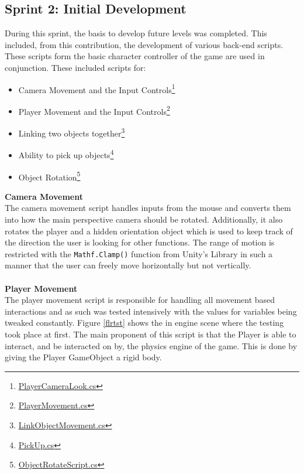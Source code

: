 \subsection{Sprint 2: Initial Development}
During this sprint, the basis to develop future levels was completed. This included, from this contribution, the development of various back-end scripts. These scripts form the basic character controller of the game are used in conjunction. These included scripts for:
\begin{itemize}
\item Camera Movement and the Input Controls\footnote{\href{https://github.com/Josh-SCG/Spherical_Shadows/blob/main/Assets/Scripts/PlayerCameraLook.cs}{PlayerCameraLook.cs}}

\item Player Movement and the Input Controls\footnote{\href{https://github.com/Josh-SCG/Spherical_Shadows/blob/main/Assets/Scripts/PlayerMovement.cs}{PlayerMovement.cs}}

\item Linking two objects together\footnote{\href{https://github.com/Josh-SCG/Spherical_Shadows/blob/main/Assets/Scripts/LinkObjectMovement.cs}{LinkObjectMovement.cs}}

\item Ability to pick up objects\footnote{\href{https://github.com/Josh-SCG/Spherical_Shadows/blob/main/Assets/Scripts/PickUp.cs}{PickUp.cs}}

\item Object Rotation\footnote{\href{https://github.com/Josh-SCG/Spherical_Shadows/blob/main/Assets/Scripts/ObjectRotateScript.cs}{ObjectRotateScript.cs}}
\end{itemize}
\newpage
\noindent \textbf{Camera Movement}\\
The camera movement script handles inputs from the mouse and converts them into how the main perspective camera should be rotated. Additionally, it also rotates the player and a hidden orientation object which is used to keep track of the direction the user is looking for other functions. The range of motion is restricted with the \texttt{Mathf.Clamp()} function from Unity's Library in such a manner that the user can freely move horizontally but not vertically. 
\\\\
\textbf{Player Movement}\\
The player movement script is responsible for handling all movement based interactions and as such was tested intensively with the values for variables being tweaked constantly. Figure \ref{flrtst} shows the in engine scene where the testing took place at first. The main proponent of this script is that the Player is able to interact, and be interacted on by, the physics engine of the game. This is done by giving the Player GameObject a rigid body.

